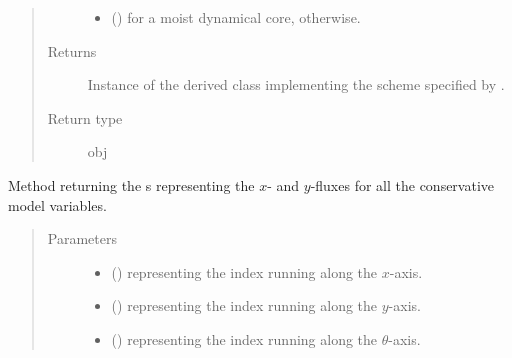 \documentclass[letterpaper,10pt,english]{sphinxmanual}
\begin{document}
\begin{fulllineitems}
\begin{fulllineitems}
\begin{quote}
\begin{description}
\begin{itemize}
\item {} 
 () \textendash{}  for a moist dynamical core,  otherwise.

\end{itemize}

\item[{Returns}] \leavevmode
Instance of the derived class implementing the scheme specified by .

\item[{Return type}] \leavevmode
obj

\end{description}\end{quote}

\end{fulllineitems}


\begin{fulllineitems}
\label{\detokenize{api:tasmania.dycore.flux_isentropic.FluxIsentropic.get_horizontal_fluxes}}
Method returning the s representing the \(x\)- and \(y\)-fluxes
for all the conservative model variables.
\begin{quote}\begin{description}
\item[{Parameters}] \leavevmode\begin{itemize}
\item {} 
 () \textendash{}  representing the index running along the \(x\)-axis.

\item {} 
 () \textendash{}  representing the index running along the \(y\)-axis.

\item {} 
 () \textendash{}  representing the index running along the \(\theta\)-axis.


\end{itemize}
\end{description}
\end{quote}
\end{fulllineitems}
\end{fulllineitems}
\end{document}
